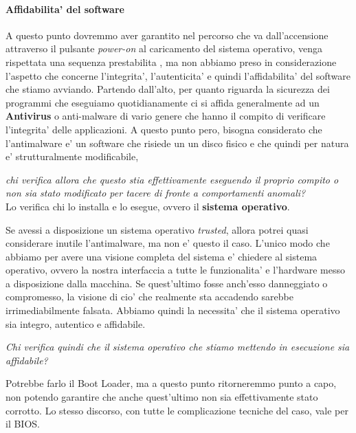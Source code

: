 \paragraph{Affidabilita' del software}
A questo punto dovremmo aver garantito nel percorso che va dall'accensione attraverso il pulsante \emph{power-on} al caricamento del sistema operativo, venga rispettata una sequenza prestabilita , ma non abbiamo preso in considerazione l'aspetto che concerne l'integrita', l'autenticita' e quindi l'affidabilita' del software che stiamo avviando. Partendo dall'alto, per quanto riguarda la sicurezza dei programmi che eseguiamo quotidianamente ci si affida generalmente ad un \textbf{Antivirus} o anti-malware di vario genere che hanno il compito di verificare l'integrita' delle applicazioni. A questo punto pero, bisogna considerato che l'antimalware e' un software che risiede un un disco fisico e che quindi per natura e' strutturalmente modificabile, 
\begin{center}
	\emph{chi verifica allora che questo stia effettivamente eseguendo il proprio compito o non sia stato modificato per tacere di fronte a comportamenti anomali?} \\
	Lo verifica chi lo installa e lo esegue, ovvero il \textbf{sistema operativo}. 
\end{center}
Se avessi a disposizione un sistema operativo \emph{trusted}, allora potrei quasi considerare inutile l'antimalware, ma non e' questo il caso. L'unico modo che abbiamo per avere una visione completa del sistema e' chiedere al sistema operativo, ovvero la nostra interfaccia a tutte le funzionalita' e l'hardware messo a disposizione dalla macchina. Se quest'ultimo fosse anch'esso danneggiato o compromesso, la visione di cio' che realmente sta accadendo sarebbe irrimediabilmente falsata. Abbiamo quindi la necessita' che il sistema operativo sia integro, autentico e affidabile. 
\begin{center}
	\emph{Chi verifica quindi che il sistema operativo che stiamo mettendo in esecuzione sia affidabile?}
\end{center}
Potrebbe farlo il Boot Loader, ma a questo punto ritorneremmo punto a capo, non potendo garantire che anche quest'ultimo non sia effettivamente stato corrotto. Lo stesso discorso, con tutte le complicazione tecniche del caso, vale per il BIOS.


